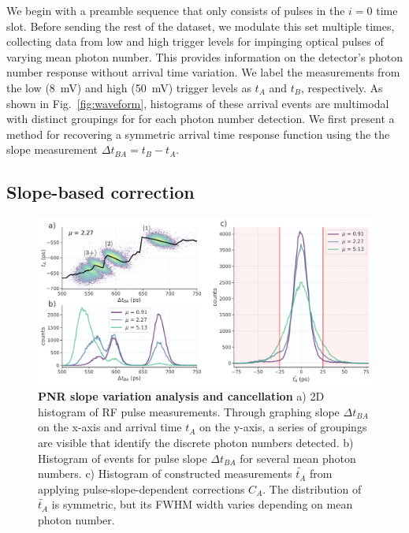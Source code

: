 \documentclass[11pt]{caltech_thesis} %
\begin{document}
We begin with a preamble sequence that only consists of pulses in the $i = 0$ time slot. Before sending the rest of the dataset, we modulate this set multiple times, collecting data from low and high trigger levels for impinging optical pulses of varying mean photon number. This provides information on the detector's photon number response without arrival time variation. We label the measurements from the low (8~mV) and high (50~mV) trigger levels as $t_A$ and $t_B$, respectively. As shown in Fig.~\ref{fig:waveform}, histograms of these arrival events are multimodal with distinct groupings for for each photon number detection. We first present a method for recovering a symmetric arrival time response function using the the slope measurement $\Delta t_{BA} = t_B - t_A$.

\hypertarget{slope-based-correction}{%
\subsection{Slope-based correction}\label{slope-based-correction}}

\hypertarget{fig:slope_correction}{%
\begin{figure}
\centering
\includegraphics[width=1\textwidth,height=\textheight]{./chapter_04/figs/slope_cancellation_light.pdf}
\caption[{PNR slope variation analysis and cancellation}]{\textbf{PNR slope variation analysis and cancellation} a) 2D histogram of RF pulse measurements. Through graphing slope $\Delta t_{BA}$ on the x-axis and arrival time $t_A$ on the y-axis, a series of groupings are visible that identify the discrete photon numbers detected. b) Histogram of events for pulse slope $\Delta t_{BA}$ for several mean photon numbers. c) Histogram of constructed measurements $\tilde{t_A}$ from applying pulse-slope-dependent corrections $C_A$. The distribution of $\tilde{t_A}$ is symmetric, but its FWHM width varies depending on mean photon number.}
\label{fig:slope_correction}
\end{figure}
}
\end{document}
